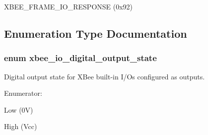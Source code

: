 X\-B\-E\-E\-\_\-\-F\-R\-A\-M\-E\-\_\-\-I\-O\-\_\-\-R\-E\-S\-P\-O\-N\-S\-E (0x92) 



\subsection{Enumeration Type Documentation}
\hypertarget{group__xbee__io_gaf104a10d2bc34550b99de92fe3564cd2}{
\subsubsection[{xbee\-\_\-io\-\_\-digital\-\_\-output\-\_\-state}]{\setlength{\rightskip}{0pt plus 5cm}enum {\bf xbee\-\_\-io\-\_\-digital\-\_\-output\-\_\-state}}}\label{group__xbee__io_gaf104a10d2bc34550b99de92fe3564cd2}


Digital output state for X\-Bee built-\/in I/\-Os configured as outputs. 

\begin{Desc}
\item[Enumerator\-: ]\par
\begin{description}
\item[{\em 
\hypertarget{group__xbee__io_ggaf104a10d2bc34550b99de92fe3564cd2ab51805fa21200aa69c1b83b718e8a48b}{X\-B\-E\-E\-\_\-\-I\-O\-\_\-\-S\-E\-T\-\_\-\-L\-O\-W}\label{group__xbee__io_ggaf104a10d2bc34550b99de92fe3564cd2ab51805fa21200aa69c1b83b718e8a48b}
}]Low (0\-V) \item[{\em 
\hypertarget{group__xbee__io_ggaf104a10d2bc34550b99de92fe3564cd2a252b4619d7e663b9b816389c34731bd7}{X\-B\-E\-E\-\_\-\-I\-O\-\_\-\-S\-E\-T\-\_\-\-H\-I\-G\-H}\label{group__xbee__io_ggaf104a10d2bc34550b99de92fe3564cd2a252b4619d7e663b9b816389c34731bd7}
}]High (Vcc) \end{description}
\end{Desc}

